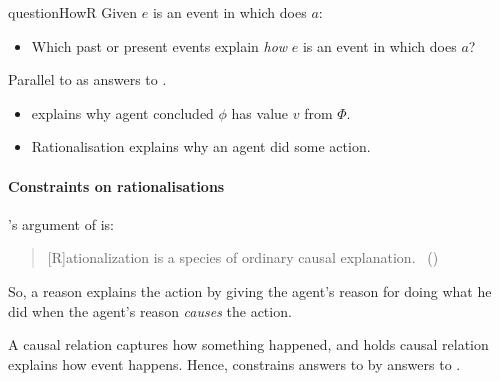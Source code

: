 \begin{note}
\begin{question}{questionHowR}{\qHowR{}}
    Given \(e\) is an event in which \vAgent{} does \(a\):

    \begin{itemize}
    \item
      Which past or present events explain \emph{how} \(e\) is an event in which \vAgent{} does \(a\)?
    \end{itemize}
    \vspace{-1.5\baselineskip}
  \end{question}

  \noindent%
  Parallel to \ros{} as answers to \qWhy{}.

  \begin{itemize}
  \item
    \ros{} explains why agent concluded \(\phi\) has value \(v\) from \(\Phi\).
  \item
    Rationalisation explains why an agent did some action.
  \end{itemize}
\end{note}

\paragraph*{Constraints on rationalisations}

\begin{note}
  \citeauthor{Davidson:1963aa}'s argument of  is:
  \begin{quote}
    [R]ationalization is a species of ordinary causal explanation.%
    \mbox{ }\hfill\mbox{(\citeyear[685]{Davidson:1963aa})}
  \end{quote}
  So, a reason explains the action by giving the agent's reason for doing what he did when the agent's reason \emph{causes} the action.

  A causal relation captures how something happened, and \citeauthor{Davidson:1963aa} holds causal relation explains how event happens.
  Hence, \citeauthor{Davidson:1963aa} constrains answers to \qWhyR{} by answers to \qHowR{}.
\end{note}

